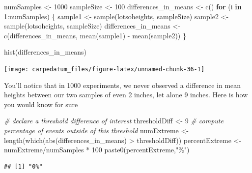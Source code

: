 \documentclass[
  openany]{book}
\newenvironment{Shaded}{\begin{snugshade}}{\end{snugshade}}
\newcommand{\CommentTok}[1]{\textcolor[rgb]{0.56,0.35,0.01}{\textit{#1}}}
\newcommand{\ControlFlowTok}[1]{\textcolor[rgb]{0.13,0.29,0.53}{\textbf{#1}}}
\newcommand{\DecValTok}[1]{\textcolor[rgb]{0.00,0.00,0.81}{#1}}
\newcommand{\FunctionTok}[1]{\textcolor[rgb]{0.00,0.00,0.00}{#1}}
\newcommand{\NormalTok}[1]{#1}
\newcommand{\OtherTok}[1]{\textcolor[rgb]{0.56,0.35,0.01}{#1}}
\newcommand{\SpecialCharTok}[1]{\textcolor[rgb]{0.00,0.00,0.00}{#1}}
\newcommand{\StringTok}[1]{\textcolor[rgb]{0.31,0.60,0.02}{#1}}
\begin{document}
\begin{Shaded}
\begin{Highlighting}[]
\NormalTok{numSamples }\OtherTok{\textless{}{-}} \DecValTok{1000}
\NormalTok{sampleSize }\OtherTok{\textless{}{-}} \DecValTok{100}
\NormalTok{differences\_in\_means }\OtherTok{\textless{}{-}} \FunctionTok{c}\NormalTok{()}
\ControlFlowTok{for}\NormalTok{ (i }\ControlFlowTok{in} \DecValTok{1}\SpecialCharTok{:}\NormalTok{numSamples) \{}
\NormalTok{  sample1 }\OtherTok{\textless{}{-}} \FunctionTok{sample}\NormalTok{(lotsoheights, sampleSize)}
\NormalTok{  sample2 }\OtherTok{\textless{}{-}} \FunctionTok{sample}\NormalTok{(lotsoheights, sampleSize)}
\NormalTok{  differences\_in\_means }\OtherTok{\textless{}{-}} \FunctionTok{c}\NormalTok{(differences\_in\_means, }\FunctionTok{mean}\NormalTok{(sample1) }\SpecialCharTok{{-}} \FunctionTok{mean}\NormalTok{(sample2))}
\NormalTok{\}}

\FunctionTok{hist}\NormalTok{(differences\_in\_means)}
\end{Highlighting}
\end{Shaded}

\begin{center}\texttt{[image: carpedatum\_files/figure-latex/unnamed-chunk-36-1]} \end{center}

You'll notice that in 1000 experiments, we never observed a difference in mean heights between our two samples of even 2 inches, let alone 9 inches. Here is how you would know for sure

\begin{Shaded}
\begin{Highlighting}[]
\CommentTok{\# declare a threshold difference of interest}
\NormalTok{thresholdDiff }\OtherTok{\textless{}{-}} \DecValTok{9}
\CommentTok{\# compute percentage of events outside of this threshold}
\NormalTok{numExtreme }\OtherTok{\textless{}{-}} \FunctionTok{length}\NormalTok{(}\FunctionTok{which}\NormalTok{(}\FunctionTok{abs}\NormalTok{(differences\_in\_means) }\SpecialCharTok{\textgreater{}}\NormalTok{ thresholdDiff))}
\NormalTok{percentExtreme }\OtherTok{\textless{}{-}}\NormalTok{ numExtreme}\SpecialCharTok{/}\NormalTok{numSamples }\SpecialCharTok{*} \DecValTok{100}
\FunctionTok{paste0}\NormalTok{(percentExtreme,}\StringTok{"\%"}\NormalTok{)}
\end{Highlighting}
\end{Shaded}

\begin{verbatim}
## [1] "0%"
\end{verbatim}
\end{document}
